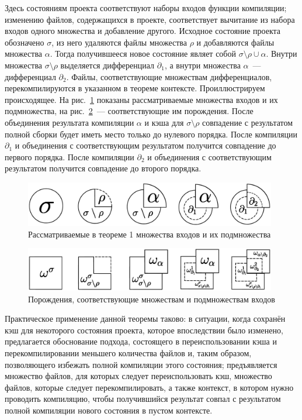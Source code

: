 Здесь состояниям проекта соответствуют наборы входов функции компиляции; изменению файлов, содержащихся в проекте, соответствует вычитание из набора входов одного множества и добавление другого. Исходное состояние проекта обозначено $\sigma$, из него удаляются файлы множества $\rho$ и добавляются файлы множества $\alpha$. Тогда получившееся новое состояние являет собой $\sigma\setminus\rho\cup\alpha$. Внутри множества $\sigma\setminus\rho$ выделяется дифференциал $\partial_1$, а внутри множества $\alpha$~--- дифференциал $\partial_2$. Файлы, соответствующие множествам дифференциалов, перекомпилируются в указанном в теореме контексте. Проиллюстрируем происходящее. На рис.~\ref{fig:theorem1_src} показаны рассматриваемые множества входов и их подмножества, на рис.~\ref{fig:theorem1_dst}~--- соответствующие им порождения. После объединения результата компиляции $\alpha$ и кэша для $\sigma\setminus\rho$ совпадение с результатом полной сборки будет иметь место только до нулевого порядка. После компиляции $\partial_1$ и объединения с соответствующим результатом получится совпадение до первого порядка. После компиляции $\partial_2$ и объединения с соответствующим результатом получится совпадение до второго порядка.

\begin{figure}[h!]
	\centering
	\includegraphics[width=11cm]{theorem1_src.eps}
	\caption{Рассматриваемые в теореме 1 множества входов и их подмножества}
	\label{fig:theorem1_src}
\end{figure}

\begin{figure}[h!]
	\centering
	\includegraphics[width=11cm]{theorem1_dst.eps}
	\caption{Порождения, соответствующие множествам и подмножествам входов}
	\label{fig:theorem1_dst}
\end{figure}

Практическое применение данной теоремы таково: в ситуации, когда сохранён кэш для некоторого состояния проекта, которое впоследствии было изменено, предлагается обоснование подхода, состоящего в переиспользовании кэша и перекомпилировании меньшего количества файлов и, таким образом, позволяющего избежать полной компиляции этого состояния; предъявляется множество файлов, для которых следует переиспользовать кэш, множество файлов, которые следует перекомпилировать, а также контекст, в котором нужно проводить компиляцию, чтобы получившийся результат совпал с результатом полной компиляции нового состояния в пустом контексте.

